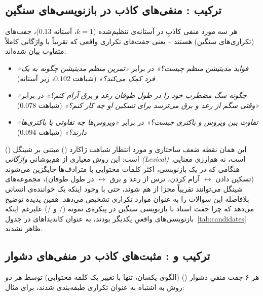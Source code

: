 \documentclass[11pt,a4paper]{article}
\begin{document}
	\subsection{ترکیب : منفی‌های کاذب در بازنویسی‌های سنگین}
	\label{sec:error-analysis-heavy}
	
	هر سه مورد منفی کاذبِ  در آستانه‌ی تنظیم‌شده ($k=1$، آستانه $0.13$)، جفت‌های  (تکراری‌های سنگین) هستند -- یعنی جفت‌های تکراری واقعی که تقریباً با واژگانی کاملاً متفاوت بیان شده‌اند:
	
	\begin{itemize}
		\item \emph{«فواید مدیتیشن منظم چیست؟»} در برابر \emph{«تمرین منظم مدیتیشن چگونه به یک فرد کمک می‌کند؟»} (شباهت $0.102$، زیر آستانه)
		\item \emph{«چگونه سگ مضطرب خود را در طول طوفان رعد و برق آرام کنم؟»} در برابر \emph{«وقتی سگم از رعد و برق می‌ترسد برای تسکین او چه کار کنم؟»} (شباهت $0.078$)
		\item \emph{«تفاوت بین ویروس و باکتری چیست؟»} در برابر \emph{«ویروس‌ها چه تفاوتی با باکتری‌ها دارند؟»} (شباهت $0.094$)
	\end{itemize}
	
	این همان نقطه ضعف ساختاری و مورد انتظار شباهت ژاکارد () مبتنی بر شینگل () است: این روش معیاری از هم‌پوشانی \emph{واژگانی (Lexical)} است، نه هم‌ارزی معنایی. هنگامی که در یک بازنویسی، اکثر کلمات محتوایی با مترادف‌ها جایگزین می‌شوند (تسکین دادن $\leftrightarrow$ آرام کردن، ترس از رعد و برق $\leftrightarrow$ در طول طوفان)، مجموعه‌های شینگل می‌توانند تقریباً مجزا از هم شوند، حتی با وجود اینکه یک خواننده‌ی انسانی بلافاصله این سوالات را به عنوان موارد تکراری تشخیص می‌دهد. همین پدیده توضیح می‌دهد که چرا جفت اسناد با بازنویسی سنگین در پیکره‌ی نمونه (/ و /) علیرغم اینکه بازنویسی‌های واقعیِ یکدیگر بودند، به عنوان کاندیداهای  در جدول~\ref{tab:candidates} ظاهر نشدند.
	
	\subsection{ترکیب  و : مثبت‌های کاذب در منفی‌های دشوار}
	\label{sec:error-analysis-hard}
	
	هر ۶ جفت منفیِ دشوار () (الگوی یکسان، تنها با تغییر یک کلمه محتوایی) توسط \emph{هر دو} روش به اشتباه به عنوان تکراری طبقه‌بندی شدند، برای مثال:
	
\end{document}
